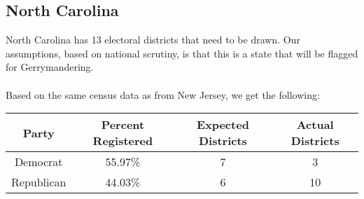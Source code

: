 \documentclass[12pt]{article}
\begin{document}
	\subsection{North Carolina}
	North Carolina has 13 electoral districts that need to be drawn.  Our assumptions, based on national scrutiny, is that this is a state that will be flagged for Gerrymandering.
	\\ \\Based on the same census data as from New Jersey, we get the following\cite{nccensus}:
		\begin{center}
			\begin{tabular}{ c  c  c  c }
				
				\textbf{Party} & \textbf{Percent Registered} & \textbf{Expected Districts} & \textbf{Actual Districts}\\ 
				\hline
				Democrat & 55.97\% & 7 & 3\\
				
				Republican & 44.03\% & 6 & 10\\
				\hline
			\end{tabular}
		\end{center}
		
\end{document}
